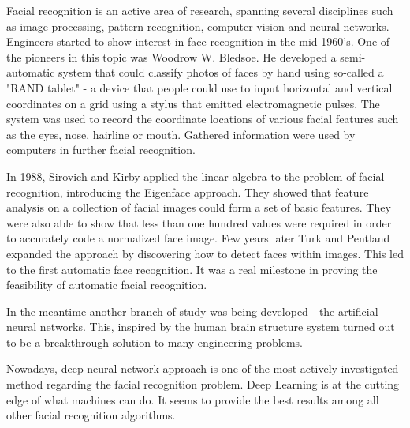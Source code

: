 Facial recognition is an active area of research, spanning several disciplines such as image processing, pattern recognition, computer vision and neural networks. Engineers started to show interest in face recognition in the mid-1960’s. One of the pioneers in this topic was Woodrow W. Bledsoe. He developed a semi-automatic system that could classify photos of faces by hand using so-called a "RAND tablet" - a device that people could use to input horizontal and vertical coordinates on a grid using a stylus that emitted electromagnetic pulses. The system was used to record the coordinate locations of various facial features such as the eyes, nose, hairline or mouth. Gathered information were used by computers in further facial recognition. 


In 1988, Sirovich and Kirby applied the linear algebra to the problem of facial recognition, introducing the Eigenface approach. They showed that feature analysis on a collection of facial images could form a set of basic features. They were also able to show that less than one hundred values were required in order to accurately code a normalized face image. Few years later Turk and Pentland expanded the approach by discovering how to detect faces within images. This led to the first automatic face recognition. It was a real milestone in proving the feasibility of automatic facial recognition.

In the meantime another branch of study was being developed - the artificial neural networks. This, inspired by the human brain structure system turned out to be a breakthrough solution to many engineering problems. 

Nowadays, deep neural network approach is one of the most actively investigated method regarding the facial recognition problem. Deep Learning is at the cutting edge of what machines can do. It seems to provide the best results among all other facial recognition algorithms. 





















